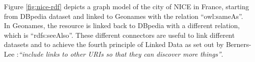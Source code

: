 \begin{figure}[ht!]
\end{figure}

Figure \ref{fig:nice-rdf} depicts a graph model of the city of NICE in France, starting from DBpedia \cite{dbpedia2009} dataset and linked to Geonames with the relation ``owl:sameAs''. In Geonames, the resource is linked back to DBpedia with a different relation, which is ``rdfs:seeAlso''. These different connectors are useful to link different datasets and to achieve the fourth principle of Linked Data as set out by Berners-Lee \cite{timld}:\textit{``include links to other URIs so that they can discover more things''}.

